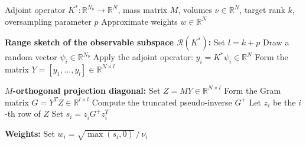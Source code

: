 \begin{algorithm}[!thbp]
\caption{Matrix-free estimation of the Elvetun--Nielsen weights}
\label{alg:en_weights}
\begin{algorithmic}[1]
    \Require Adjoint operator $K^*: \mathbb{R}^{N_b} \to \mathbb{R}^N$, mass matrix $M$, volumes $\nu \in \mathbb{R}^N$, target rank $k$, oversampling parameter $p$
    \Ensure Approximate weights $w \in \mathbb{R}^N$

    \State \textbf{Range sketch of the observable subspace $\mathcal{R}(K^*)$:}
    \State Set $l = k + p$
        \State Draw a random vector $\psi_i \in \mathbb{R}^{N_b}$
        \State Apply the adjoint operator: $y_i = K^* \psi_i \in \mathbb{R}^N$
    \EndFor
    \State Form the matrix $Y = [y_1, \dots, y_l] \in \mathbb{R}^{N \times l}$ 

    \State \textbf{$M$-orthogonal projection diagonal:}
    \State Set $Z = M Y \in \mathbb{R}^{N \times l}$
    \State Form the Gram matrix $G = Y^T Z \in \mathbb{R}^{l \times l}$ 
    \State Compute the truncated pseudo-inverse $G^{+}$ 
        \State Let $z_i$ be the $i$-th row of $Z$
        \State Set $s_i = z_i^{} G^{+} z_i^T$ 
    \EndFor

    \State \textbf{Weights:}
        \State Set $w_i = \sqrt{\max(s_i, 0)} \, / \, \nu_i$
    \EndFor

\end{algorithmic}
\end{algorithm}
